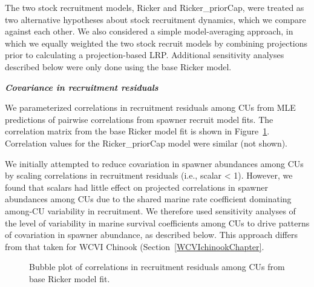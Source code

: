 \documentclass[11pt]{book}
\begin{document}
The two stock recruitment models, Ricker and Ricker\_priorCap, were treated as two alternative hypotheses about stock recruitment dynamics, which we compare against each other. We also considered a simple model-averaging approach, in which we equally weighted the two stock recruit models by combining projections prior to calculating a projection-based LRP. Additional sensitivity analyses described below were only done using the base Ricker model.

\textbf{\emph{Covariance in recruitment residuals}}

We parameterized correlations in recruitment residuals among CUs from MLE predictions of pairwise correlations from spawner recruit model fits. The correlation matrix from the base Ricker model fit is shown in Figure~\ref{fig:coho-recruitResid-Ricker}. Correlation values for the Ricker\_priorCap model were similar (not shown).

We initially attempted to reduce covariation in spawner abundances among CUs by scaling correlations in recruitment residuals (i.e., scalar \textless{} 1). However, we found that scalars had little effect on projected correlations in spawner abundances among CUs due to the shared marine rate coefficient dominating among-CU variability in recruitment. We therefore used sensitivity analyses of the level of variability in marine survival coefficients among CUs to drive patterns of covariation in spawner abundance, as described below. This approach differs from that taken for WCVI Chinook (Section~\ref{WCVIchinookChapter}.
\begin{figure}[htb]

{\centering {} 

}

\caption{Bubble plot of correlations in recruitment residuals among CUs from base Ricker model fit.}\label{fig:coho-recruitResid-Ricker}
\end{figure}
\linebreak
\end{document}
